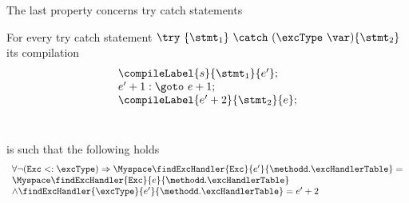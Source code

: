 The last property concerns try catch statements
\begin{compProp10}\label{compile:prop:compProp10}
For every try catch statement $ \try \ \{ \stmt_1 \} \ \catch \ (\excType \ \var )\{ \stmt_2 \}  $ 
its compilation $$
\begin{array}{l} 
\compileLabel{s}{\stmt_1}{e'}; \\
                       e' + 1: \goto \ e + 1; \\
		  
                       \compileLabel{e' + 2 }{\stmt_2}{e };\\
		       \\ \\

 \end{array}$$
is such that the following holds 
$$\begin{array}{l} \forall \neg ( \mbox{\rm{\texttt{Exc}}} <: \excType ) \Rightarrow
 \Myspace   \findExcHandler{\mbox{\rm\tt{Exc}} }{e'}{\methodd.\excHandlerTable} =\\ 
 \Myspace   \findExcHandler{\mbox{\rm\tt{Exc}} }{e}{\methodd.\excHandlerTable}  \\
 \wedge
  \findExcHandler{\excType }{e'}{\methodd.\excHandlerTable} = e'+2 \\ 
 \end{array} $$



\end{compProp10}


